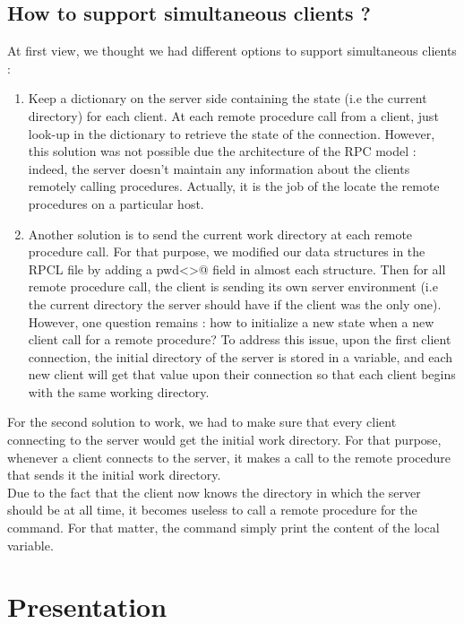 \documentclass{article}
\begin{document}
\subsection{How to support simultaneous clients ?}
At first view, we thought we had different options to support simultaneous clients :
\begin{enumerate}
\item Keep a dictionary on the server side containing the state (i.e the current directory) for each client. At each remote procedure call from a client, just look-up in the dictionary to retrieve the state of the connection. However, this solution was not possible due the architecture of the RPC model : indeed, the server doesn't maintain any information about the clients remotely calling procedures. Actually, it is the job of the \verb@PortMapper@ locate the remote procedures on a particular host.
\item Another solution is to send the current work directory at each remote procedure call. For that purpose, we modified our data structures in the RPCL file by adding a \verb@string pwd<>@ field in almost each structure. Then for all remote procedure call, the client is sending its own server environment (i.e the current directory the server should have if the client was the only one). However, one question remains : how to initialize a new state when a new client call for a remote procedure? To address this issue, upon the first client connection, the initial directory of the server is stored in a variable, and each new client will get that value upon their connection so that each client begins with the same working directory.
\end{enumerate}
For the second solution to work, we had to make sure that every client connecting to the server would get the initial work directory.
For that purpose, whenever a client connects to the server, it makes a call to the remote procedure \verb@pwd@ that sends it the initial work directory. \\
Due to the fact that the client now knows the directory in which the server should be at all time, it becomes useless to call a remote procedure for the \verb@pwd@ command. For that matter, the command simply print the content of the local variable.

\section{Presentation}
\end{document}
